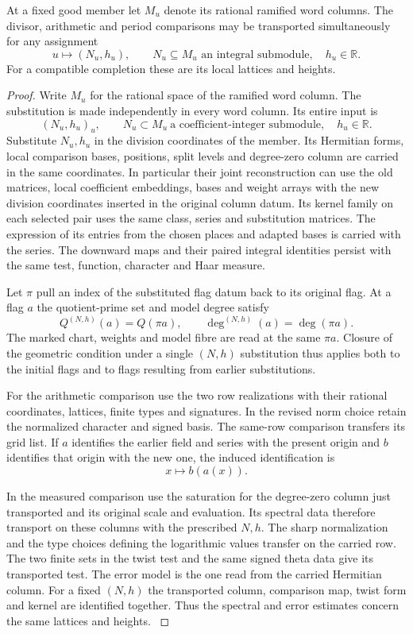 \begin{lemma}
At a fixed good member let \(M_u\) denote its rational ramified word columns. The divisor, arithmetic and period comparisons may be transported simultaneously for any assignment
\[
 u\longmapsto(N_u,h_u),\qquad N_u\subseteq M_u\text{ an integral submodule},\quad h_u\in\mathbb R.
\] For a compatible completion these are its local
lattices and heights.
\end{lemma}
\begin{proof}
Write \(M_u\) for the rational space of the ramified word
column. The substitution is made independently in every word column. Its entire input is
\[
 (N_u,h_u)_u,\qquad N_u\subset M_u\ \text{a coefficient-integer submodule},\quad h_u\in\mathbb R .
\] Substitute \(N_u,h_u\) in the division
coordinates of the member. Its Hermitian forms, local
comparison bases, positions, split levels and degree-zero column
are carried in the same coordinates. In particular their joint
reconstruction can use the old matrices, local coefficient
embeddings, bases and weight arrays with the new division
coordinates inserted in the original column datum. Its kernel
family on each selected pair uses the same class, series and
substitution matrices. The expression of its entries from
the chosen places and adapted bases is carried with the series.
The downward maps and their paired integral identities persist
with the same test, function, character and Haar measure.

Let \(\pi\) pull an index of the substituted flag datum back to
its original flag. At a flag \(a\) the quotient-prime set and
model degree satisfy
\[
 Q^{(N,h)}(a)=Q(\pi a),\qquad
 \deg^{(N,h)}(a)=\deg(\pi a).
\]
The marked chart, weights and model fibre are read at the same
\(\pi a\). Closure of the geometric condition under a single
\((N,h)\) substitution thus applies both to the initial flags
and to flags resulting from earlier substitutions. \label{cor:automorphic-realization-63}

For the arithmetic comparison use the two row realizations with their
rational coordinates, lattices, finite types and signatures.
In the revised norm choice retain the normalized character and
signed basis. The same-row comparison transfers its grid list.
If \(a\) identifies the earlier field and series with the present origin and \(b\) identifies that origin with the new one, the induced identification is
\[
 x\longmapsto b(a(x)).
\]

In the measured comparison use the saturation for the
degree-zero column just transported and its original scale and
evaluation. Its spectral data therefore transport on these
columns with the prescribed \(N,h\). The sharp normalization
and the type choices defining the logarithmic values transfer
on the carried row. The two finite sets in the twist test and the
same signed theta data give its transported test. The error
model is the one read from the carried Hermitian column.
For a fixed \((N,h)\) the transported column, comparison map, twist form and kernel are identified together. Thus the spectral and error estimates concern the same lattices and heights. \label{cor:automorphic-realization-64}


\end{proof}
